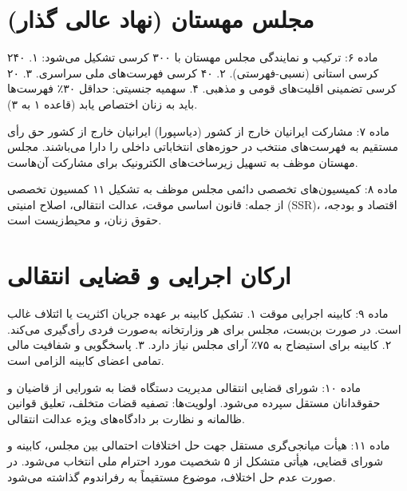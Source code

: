\documentclass[12pt,a4paper,oneside]{report}
\begin{document}
\chapter{مجلس مهستان (نهاد عالی گذار)}

\begin{articlebox}{ماده ۶: ترکیب و نمایندگی}
مجلس مهستان با ۳۰۰ کرسی تشکیل می‌شود:
۱. ۲۴۰ کرسی استانی (نسبی-فهرستی).
۲. ۴۰ کرسی فهرست‌های ملی سراسری.
۳. ۲۰ کرسی تضمینی اقلیت‌های قومی و مذهبی.
۴. سهمیه جنسیتی: حداقل ۳۰٪ فهرست‌ها باید به زنان اختصاص یابد (قاعده ۱ به ۳).
\end{articlebox}

\begin{articlebox}{ماده ۷: مشارکت ایرانیان خارج از کشور (دیاسپورا)}
ایرانیان خارج از کشور حق رأی مستقیم به فهرست‌های منتخب در حوزه‌های انتخاباتی داخلی را دارا می‌باشند. مجلس مهستان موظف به تسهیل زیرساخت‌های الکترونیک برای مشارکت آن‌هاست.
\end{articlebox}

\begin{articlebox}{ماده ۸: کمیسیون‌های تخصصی دائمی}
مجلس موظف به تشکیل ۱۱ کمسیون تخصصی از جمله: قانون اساسی موقت، عدالت انتقالی، اصلاح امنیتی (SSR)، اقتصاد و بودجه، حقوق زنان، و محیط‌زیست است.
\end{articlebox}

\chapter{ارکان اجرایی و قضایی انتقالی}

\begin{articlebox}{ماده ۹: کابینه اجرایی موقت}
۱. تشکیل کابینه بر عهده جریان اکثریت یا ائتلاف غالب است. در صورت بن‌بست، مجلس برای هر وزارتخانه به‌صورت فردی رأی‌گیری می‌کند.
۲. کابینه برای استیضاح به ۷۵٪ آرای مجلس نیاز دارد.
۳. پاسخگویی و شفافیت مالی تمامی اعضای کابینه الزامی است.
\end{articlebox}

\begin{articlebox}{ماده ۱۰: شورای قضایی انتقالی}
مدیریت دستگاه قضا به شورایی از قاضیان و حقوقدانان مستقل سپرده می‌شود. اولویت‌ها: تصفیه قضات متخلف، تعلیق قوانین ظالمانه و نظارت بر دادگاه‌های ویژه عدالت انتقالی.
\end{articlebox}

\begin{articlebox}{ماده ۱۱: هیأت میانجی‌گری مستقل}
جهت حل اختلافات احتمالی بین مجلس، کابینه و شورای قضایی، هیأتی متشکل از ۵ شخصیت مورد احترام ملی انتخاب می‌شود. در صورت عدم حل اختلاف، موضوع مستقیماً به رفراندوم گذاشته می‌شود.
\end{articlebox}
\end{document}

